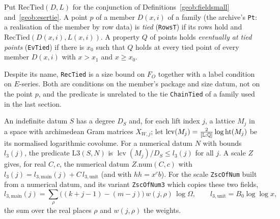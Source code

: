 \begin{definition}\label{geob:rectied}
Put $\mathrm{RecTied}(D,L)$ for the conjunction of
Definitions~\ref{geob:fieldsmall} and~\ref{geob:esertie}. A point $p$ of a
member $D(x,i)$ of a family (the archive's \texttt{Pt}: a realisation of the
member by row data) is \emph{tied} (\texttt{RowsT}) if its rows hold and
$\mathrm{RecTied}(D(x,i),L(x,i))$. A property $Q$ of points holds
\emph{eventually at tied points} (\texttt{EvTied}) if there is $x_0$ such that
$Q$ holds at every tied point of every member $D(x,i)$ with $x>x_1$ and
$x\ge x_0$.
\end{definition}

\begin{remark}
Despite its name, \texttt{RecTied} is a size bound on $F_O$ together with a
label condition on $E$-series. Both are conditions on the member's package and
size datum, not on the point $p$, and the predicate is unrelated to the tie
\texttt{ChainTied} of a family used in the last section.
\end{remark}

\begin{definition}\label{geob:L3}
An indefinite datum $S$ has a degree $D_S$ and, for each lift index $j$, a
lattice $M_j$ in a space with archimedean Gram matrices $X_{W,j}$; let
$\operatorname{lcv}(M_j)=\frac2{[\mathbb L:\mathbb{Q}]}\log\operatorname{ht}(M_j)$ be its
normalised logarithmic covolume. For a numerical datum $N$ with bounds
$l_3(j)$, the predicate $\mathrm{L3}(S,N)$ is
$\operatorname{lcv}(M_j)/D_S\le l_3(j)$ for all $j$. A scale $Z$ gives, for
real $C,c$, the numerical datum $Z.\mathrm{num}(C,c)$ with
$l_3(j)=l_{3,\mathrm{main}}(j)+C\,l_{3,\mathrm{unit}}$ (and with $hh=x^cb$). For
the scale \texttt{ZscOfNum} built from a numerical datum, and its variant
\texttt{ZscOfNum3} which copies these two fields,
\[
l_{3,\mathrm{main}}(j)=\sum_{\rho}\bigl((k+j-1)-(m-j)\bigr)\,w(j,\rho)\,\log\Omega,
\qquad l_{3,\mathrm{unit}}=B_0\log\log x,
\]
the sum over the real places $\rho$ and $w(j,\rho)$ the weights.
\end{definition}

